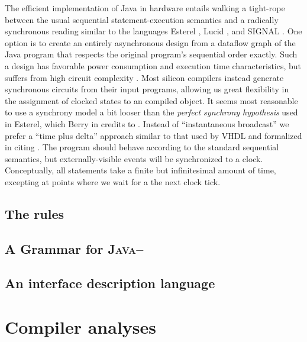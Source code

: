 \documentclass[10pt,notitlepage,twocolumn]{article}
\begin{document}
The efficient implementation of Java in hardware entails walking a
tight-rope between the usual sequential statement-execution semantics
and a radically synchronous reading similar to the languages Esterel
\cite{berry:esterel_primer}, Lucid \cite{missing_reference}, and
SIGNAL \cite{amagbegnon95:signal}.  One option is to create an
entirely asynchronous design \cite{emerson97:async_design}
from a dataflow graph of the Java program
that respects the original program's sequential order exactly.  Such a
design has favorable power consumption and execution time
characteristics, but suffers from high circuit complexity
\cite{cheng97:diclasp, nanda97:universal}.
Most silicon compilers instead generate synchronous circuits from
their input programs, allowing us great flexibility in the assignment
of clocked states to an compiled object.  It seems most reasonable to
use a synchrony model a bit looser than the \textit{perfect synchrony
hypothesis} used in Esterel, which Berry in
\cite{berry92:hardware_esterel} credits to \cite{benveniste91:synchrony}.
Instead of ``instantaneous broadcast'' we prefer a ``time plus delta''
approach similar to that used by VHDL 
\cite{one_of_the_books_i_used_for_the_silicon_c_paper} and formalized
in \cite{gagne97:nonstandard} citing \cite{gagne96:nonstandard}.  The
program should behave according to the standard sequential semantics,
but externally-visible events will be synchronized to a clock.
Conceptually, all statements take a finite but infinitesimal amount of
time, excepting at points where we wait for a the next clock tick.


\subsection{The rules}

\subsection{A Grammar for \textsc{Java--}}
\subsection{An interface description language}
\section{Compiler analyses}
\end{document}
